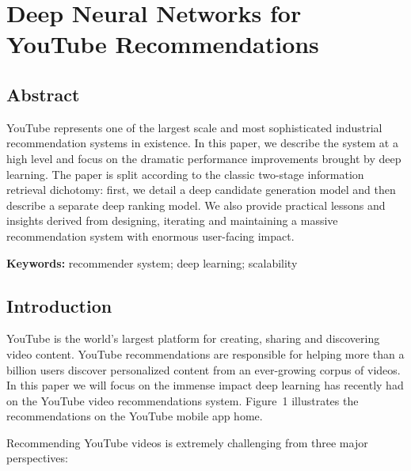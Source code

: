 \chapter{Deep Neural Networks for YouTube Recommendations}

\section{Abstract}

YouTube represents one of the largest scale and most sophisticated industrial
recommendation systems in existence. In this paper, we describe the system at
a high level and focus on the dramatic performance improvements brought by
deep learning. The paper is split according to the classic two-stage
information retrieval dichotomy: first, we detail a deep candidate generation
model and then describe a separate deep ranking model. We also provide
practical lessons and insights derived from designing, iterating and
maintaining a massive recommendation system with enormous user-facing impact.

\textbf{Keywords:} recommender system; deep learning; scalability

\section{Introduction}

YouTube is the world's largest platform for creating, sharing and discovering
video content. YouTube recommendations are responsible for helping more than
a billion users discover personalized content from an ever-growing corpus of
videos. In this paper we will focus on the immense impact deep learning has
recently had on the YouTube video recommendations system. Figure~1
illustrates the recommendations on the YouTube mobile app home.

Recommending YouTube videos is extremely challenging from three major
perspectives:

